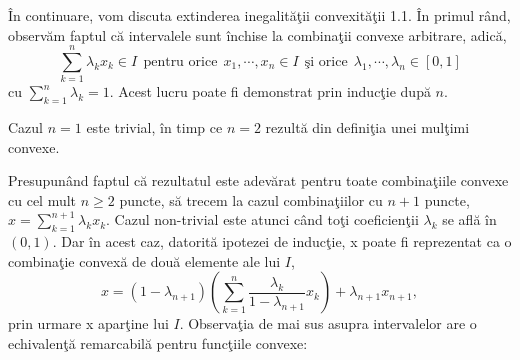 \documentclass[a4paper,12pt,oneside]{report}
\begin{document}
\^{I}n continuare, vom discuta extinderea inegalit\u{a}\c{t}ii convexit\u{a}\c{t}ii 1.1. \^{I}n primul r\^{a}nd, observ\u{a}m faptul c\u{a} intervalele sunt \^{i}nchise la combina\c{t}ii convexe arbitrare, adic\u{a},
\begin{displaymath}
  \sum_{ k= 1}^{n}\lambda _{k}x_{k} \in I~~\mbox{pentru orice}~~x_{1},\cdots, x_{n} \in I  ~~\mbox{\c{s}i orice}~~\lambda _{1},\cdots, \lambda _{n} \in \left [ 0 , 1  \right ]
\end{displaymath}
 cu \(\sum_{k = 1}^{n} \lambda _{k} = 1\).
Acest lucru poate fi demonstrat prin induc\c{t}ie dup\u{a} \(n\).

\noindent Cazul \(n=1\) este trivial, \^{i}n timp ce \(n = 2\) rezult\u{a} din defini\c{t}ia unei mul\c{t}imi convexe.

  Presupun\^{a}nd faptul c\u{a} rezultatul este adev\u{a}rat pentru toate combina\c{t}iile convexe cu cel mult \(n\geq 2\) puncte, s\u{a} trecem la cazul combina\c{t}iilor cu \(n + 1\) puncte, \(x = \sum_{k = 1}^{n + 1} \lambda _{k}x_{k}\). Cazul non-trivial este atunci c\^{a}nd to\c{t}i coeficien\c{t}ii \(\lambda _{k}\) se afl\u{a} \^{i}n \(\left ( 0 , 1 \right )\). Dar \^{i}n acest caz, datorit\u{a} ipotezei de induc\c{t}ie, x poate fi reprezentat ca o combina\c{t}ie convex\u{a} de dou\u{a} elemente ale lui \(I\),
\begin{displaymath}
  x = \left ( 1 - \lambda _{n + 1} \right )\left ( \sum_{k = 1}^{n} \frac{\lambda _{k}}{1 - \lambda _{n + 1}} x_{k}\right ) + \lambda _{n + 1}x_{n + 1},
\end{displaymath}
prin urmare x apar\c{t}ine lui \(I\).
  Observa\c{t}ia de mai sus asupra intervalelor are o echivalen\c{t}\u{a} remarcabil\u{a} pentru func\c{t}iile convexe:
\end{document}

